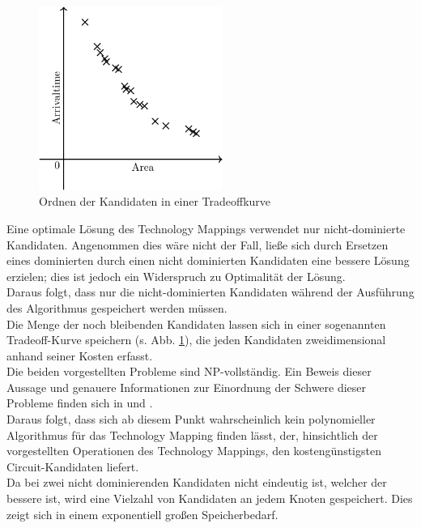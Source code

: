 \documentclass[11pt, a4paper, german]{article}
\newcommand{\TM}{Technology  Mapping }
\begin{document}
 \begin{figure}
		\includegraphics[width = 6cm]{pictures/compiled/tradeoff_kurve}
		\caption{Ordnen der Kandidaten in einer Tradeoffkurve}
		\label{bild:tradeoff_kurve}
\end{figure}
Eine optimale Lösung des Technology Mappings verwendet nur nicht-dominierte Kandidaten.
Angenommen dies wäre nicht der Fall, ließe sich durch Ersetzen eines dominierten durch einen nicht dominierten Kandidaten eine bessere Lösung erzielen; dies ist jedoch ein Widerspruch zu Optimalität der Lösung.\\
Daraus folgt, dass nur die nicht-dominierten Kandidaten während der Ausführung des Algorithmus gespeichert werden müssen.\\
Die Menge der noch bleibenden Kandidaten lassen sich in einer sogenannten Tradeoff-Kurve speichern (s. Abb. \ref{bild:tradeoff_kurve}), die jeden Kandidaten zweidimensional anhand seiner Kosten erfasst.\\

Die beiden vorgestellten Probleme sind NP-vollständig. Ein Beweis dieser Aussage und genauere Informationen zur Einordnung der Schwere dieser Probleme finden sich in \cite{ComplexitySynthesis} und \citep{Elbert}. \\
Daraus folgt, dass sich ab diesem Punkt wahrscheinlich  kein polynomieller Algorithmus für das \TM finden lässt, der, hinsichtlich der vorgestellten Operationen des Technology Mappings, den kostengünstigsten Circuit-Kandidaten liefert.\\
Da bei zwei nicht dominierenden Kandidaten nicht eindeutig ist, welcher der bessere ist,  wird eine Vielzahl von Kandidaten an jedem Knoten gespeichert. Dies zeigt sich in einem exponentiell großen Speicherbedarf. 
\end{document}

